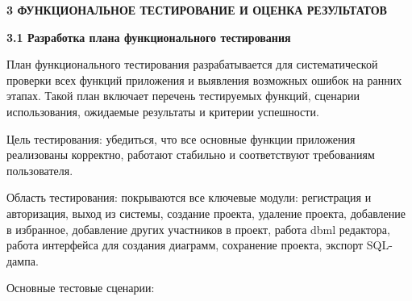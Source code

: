 \newpage
\begin{center}
  \textbf{\large 3 ФУНКЦИОНАЛЬНОЕ ТЕСТИРОВАНИЕ И ОЦЕНКА РЕЗУЛЬТАТОВ}
\end{center}

\textbf{\large 3.1 Разработка плана функционального тестирования}


План функционального тестирования разрабатывается для
систематической проверки всех функций приложения и выявления возможных
ошибок на ранних этапах. Такой план включает перечень тестируемых
функций, сценарии использования, ожидаемые результаты и критерии
успешности.

Цель тестирования: убедиться, что все основные функции приложения
реализованы корректно, работают стабильно и соответствуют требованиям
пользователя.

Область тестирования: покрываются все ключевые модули: регистрация
и авторизация, выход из системы, создание проекта, удаление проекта, добавление в избранное, добавление других участников в проект, работа dbml редактора, работа интерфейса для создания диаграмм, сохранение проекта, экспорт SQL-дампа.

Основные тестовые сценарии:

